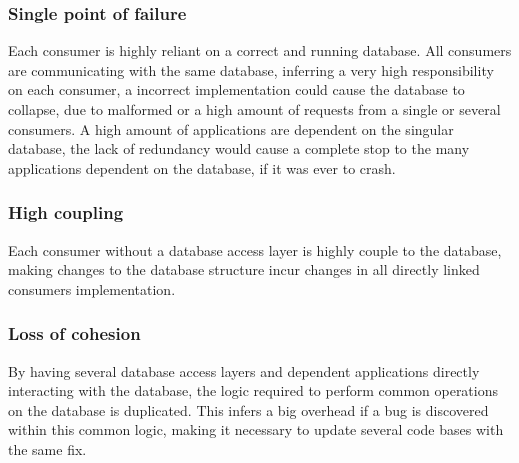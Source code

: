 \subsubsection{Single point of failure}
Each consumer is highly reliant on a correct and running database. All consumers are communicating with the same database, inferring a very high responsibility on each consumer, a incorrect implementation could cause the database to collapse, due to malformed or a high amount of requests from a single or several consumers.
A high amount of applications are dependent on the singular database, the lack of redundancy would cause a complete stop to the many applications dependent on the database, if it was ever to crash.

\subsubsection{High coupling}
Each consumer without a database access layer is highly couple to the database, making changes to the database structure incur changes in all directly linked consumers implementation.

\subsubsection{Loss of cohesion}
By having several database access layers and dependent applications directly interacting with the database, the logic required to perform common operations on the database is duplicated. This infers a big overhead if a bug is discovered within this common logic, making it necessary to update several code bases with the same fix.


